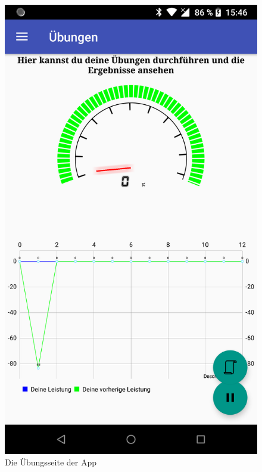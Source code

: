 \begin{multicols}{2}
\begin{figure}[H]
\end{figure}
\begin{figure}[H]
	\centering
	\includegraphics[scale=0.1]{pics/device-exercise.png}
	\caption{Die Übungsseite der App}
\end{figure}
\begin{figure}[H]
	\centering

\end{figure}
\end{multicols}
